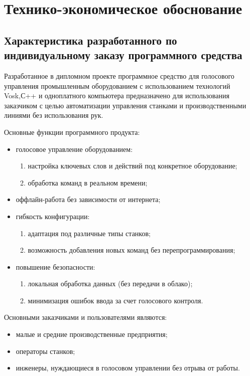\section{Технико-экономическое обоснование }

\subsection{Характеристика разработанного по индивидуальному заказу
	программного средства}

Разработанное в дипломном проекте программное средство для голосового управления промышленным оборудованием с использованием технологий Vosk,С++ и одноплатного компьютера предназначено для использования заказчиком с целью автоматизации управления станками и производственными линиями без использования рук.

Основные функции программного продукта:
\begin{itemize}
	\item голосовое управление оборудованием:
	\begin{enumerate}[label=\alph*)]
		\item настройка ключевых слов и действий под конкретное оборудование;
		\item обработка команд в реальном времени;
	\end{enumerate}
	
	\item оффлайн-работа без зависимости от интернета;
	\item гибкость конфигурации:
	\begin{enumerate}[label=\alph*)]
		\item адаптация под различные типы станков;
		\item возможность добавления новых команд без перепрограммирования;
	\end{enumerate}
	
	\item повышение безопасности:
	\begin{enumerate}[label=\alph*)]
		\item локальная обработка данных (без передачи в облако);
		\item минимизация ошибок ввода за счет голосового контроля.
	\end{enumerate}
\end{itemize}

Основными заказчиками и пользователями являются:
\begin{itemize}
	\item малые и средние производственные предприятия;
	\item операторы станков;
	\item инженеры, нуждающиеся в голосовом управлении без отрыва от работы.
\end{itemize}


